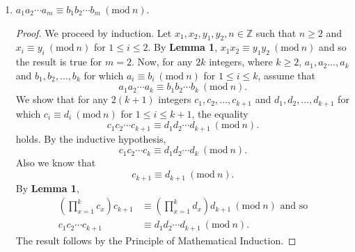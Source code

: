 \documentclass[12pt]{article}
\newcommand{\Z}{\mathbb{Z}}
\newcommand{\Mod}[1]{\ (\mathrm{mod}\ #1)}
\newenvironment{problem}[2][Problem]{\begin{trivlist}
		\item[\hskip \labelsep {\bfseries #1}\hskip \labelsep {\bfseries #2.}]}{\end{trivlist}}
\begin{document}
\begin{problem}{30}
\begin{enumerate}
\begin{proof}
		\end{proof}
		\item $a_{1}a_{2}\cdots a_{m} \equiv b_{1}b_{2}\cdots b_{m} \Mod{n}$.
		\begin{proof}
			We proceed by induction. Let $x_{1},x_{2},y_{1},y_{2},n\in \Z$ such that $n\geq 2$ and $x_{i} \equiv y_{i} \Mod{n}$ for $1\leq i \leq 2$. By \textbf{Lemma 1}, $x_{1}x_{2} \equiv y_{1}y_{2} \Mod{n}$ and so the result is true for $m=2$. Now, for any $2k$ integers, where $k\geq 2$, $a_{1},a_{2}\ldots,a_{k}$ and $b_{1},b_{2},\ldots,b_{k}$ for which $a_{i} \equiv b_{i} \Mod{n}$ for $1\leq i \leq k$, assume that 
			\begin{equation*}
				a_{1}a_{2}\cdots a_{k} \equiv b_{1}b_{2}\cdots b_{k} \Mod{n}.
			\end{equation*} 
			 We show that for any $2(k+1)$ integers $c_{1},c_{2},\ldots,c_{k+1}$ and $d_{1},d_{2},\ldots,d_{k+1}$ for which $c_{i} \equiv d_{i} \Mod{n}$ for $1\leq i \leq k+1$, the equality
			\begin{equation*}
					c_{1}c_{2}\cdots c_{k+1} \equiv d_{1}d_{2}\cdots d_{k+1} \Mod{n}.
			\end{equation*}
		holds. By the inductive hypothesis, 
		\begin{equation*}
			c_{1}c_{2}\cdots c_{k} \equiv d_{1}d_{2}\cdots d_{k} \Mod{n}.
		\end{equation*}
	Also we know that 
	\begin{equation*}
		c_{k+1} \equiv d_{k+1} \Mod{n}.
	\end{equation*}
	By \textbf{Lemma 1}, 
	\begin{align*}
		\left(\prod_{x=1}^{k}c_{x}\right) c_{k+1} &\equiv \left(\prod_{x=1}^{k}d_{x}\right)d_{k+1} \Mod{n} \text{ and so}\\
		c_{1}c_{2}\cdots c_{k+1} &\equiv d_{1}d_{2}\cdots d_{k+1} \Mod{n}.
	\end{align*}
The result follows by the Principle of Mathematical Induction.
		\end{proof}
	\end{enumerate}
\end{problem}
\end{document}
